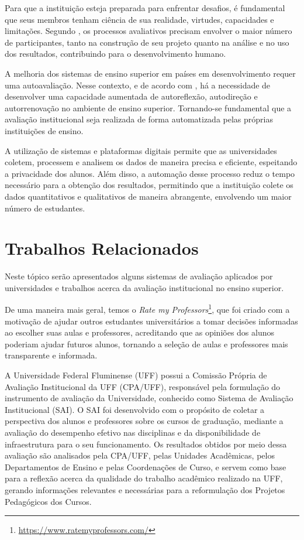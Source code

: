 Para que a instituição esteja preparada para enfrentar desafios, é fundamental que seus membros tenham ciência de sua realidade, virtudes, capacidades e limitações.
Segundo , os processos avaliativos precisam envolver o maior número de participantes, tanto na construção de seu projeto quanto na análise e no uso dos resultados, contribuindo para o desenvolvimento humano.

A melhoria dos sistemas de ensino superior em países em desenvolvimento requer uma autoavaliação. Nesse contexto, e de acordo com , há a necessidade de desenvolver uma capacidade aumentada de autoreflexão, autodireção e autorrenovação no ambiente de ensino superior. Tornando-se fundamental que a avaliação institucional seja realizada de forma automatizada pelas próprias instituições de ensino.

A utilização de sistemas e plataformas digitais permite que as universidades coletem, processem e analisem os dados de maneira precisa e eficiente, espeitando a privacidade dos alunos. Além disso, a automação desse processo reduz o tempo necessário para a obtenção dos resultados, permitindo que a instituição colete os dados quantitativos e qualitativos de maneira abrangente, envolvendo um maior número de estudantes.



\section{Trabalhos Relacionados}
Neste tópico serão apresentados alguns sistemas de avaliação aplicados por universidades e trabalhos acerca da avaliação institucional no ensino superior.

De uma maneira mais geral, temos o \textit{Rate my Professors}\footnote{\url{https://www.ratemyprofessors.com/}}, que foi criado
com a motivação de ajudar outros estudantes universitários a tomar decisões informadas ao escolher suas aulas e professores, acreditando que as opiniões dos alunos poderiam ajudar futuros alunos, tornando a seleção de aulas e professores mais transparente e informada.

A Universidade Federal Fluminense (UFF) possui a Comissão Própria de Avaliação Institucional da UFF (CPA/UFF),
responsável pela formulação do instrumento de avaliação da Universidade, conhecido como Sistema de Avaliação Institucional (SAI).
O SAI foi desenvolvido com o propósito de coletar a perspectiva dos alunos e professores sobre os cursos de graduação,
mediante a avaliação do desempenho efetivo nas disciplinas e da disponibilidade de infraestrutura para o seu funcionamento.
Os resultados obtidos por meio dessa avaliação são analisados pela CPA/UFF, pelas Unidades Acadêmicas, pelos Departamentos de Ensino e pelas Coordenações de Curso,
e servem como base para a reflexão acerca da qualidade do trabalho acadêmico realizado na UFF, gerando informações relevantes e necessárias para a reformulação dos Projetos Pedagógicos dos Cursos.




